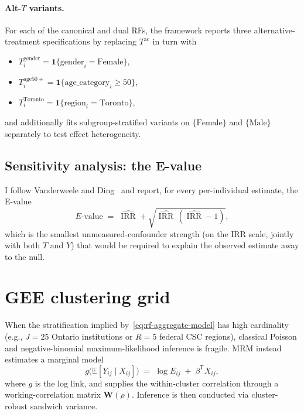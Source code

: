 \documentclass[11pt,a4paper]{article}
\theoremstyle{plain}
\theoremstyle{definition}
\theoremstyle{remark}
\newcommand{\E}{\mathbb{E}}
\newcommand{\one}{\mathbf{1}}
\newcommand{\T}{\mathsf{T}}
\DeclareMathOperator{\IRR}{IRR}
\begin{document}
\paragraph{Alt-$T$ variants.}
For each of the canonical and dual RFs, the framework reports
three alternative-treatment specifications by replacing
$T^{\mathrm{ac}}$ in turn with
\begin{itemize}
  \item $T^{\mathrm{gender}}_{i} = \one\{\mathrm{gender}_{i} = \mathrm{Female}\}$,
  \item $T^{\mathrm{age50+}}_{i} = \one\{\mathrm{age\_category}_{i} \ge 50\}$,
  \item $T^{\mathrm{Toronto}}_{i} = \one\{\mathrm{region}_{i} = \mathrm{Toronto}\}$,
\end{itemize}
and additionally fits subgroup-stratified variants on
$\{\mathrm{Female}\}$ and $\{\mathrm{Male}\}$ separately to test
effect heterogeneity.

\subsection{Sensitivity analysis: the E-value}

I follow Vanderweele and Ding~\cite{VanderWeele2017Evalue} and
report, for every per-individual estimate, the E-value
\begin{equation}
  E\text{-value}\;=\; \widehat{\IRR} + \sqrt{\widehat{\IRR}\,
   (\widehat{\IRR} - 1)},
  \label{eq:evalue}
\end{equation}
which is the smallest unmeasured-confounder strength (on the IRR
scale, jointly with both $T$ and $Y$) that would be required to
explain the observed estimate away to the null.

\section{GEE clustering grid}
\label{sec:gee-grid}

When the stratification implied by~\eqref{eq:rf-aggregate-model}
has high cardinality (e.g., $J = 25$ Ontario institutions or
$R = 5$ federal CSC regions), classical Poisson and
negative-binomial maximum-likelihood inference is fragile. MRM
instead estimates a marginal model
\begin{equation}
  g\bigl(\E[Y_{ij} \mid X_{ij}]\bigr) \;=\;
   \log E_{ij} \;+\; \beta^{\T} X_{ij},
  \label{eq:rf-gee-marginal}
\end{equation}
where $g$ is the log link, and supplies the within-cluster
correlation through a working-correlation matrix
$\mathbf{W}(\rho)$. Inference is then conducted via cluster-robust
sandwich variance.
\end{document}
